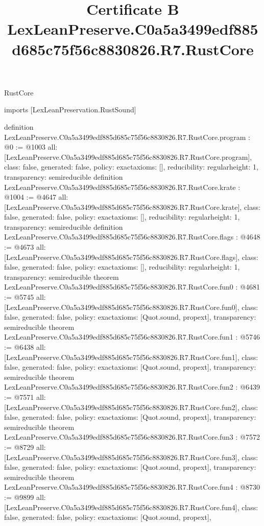 \begin{lexlean}{RustCore}
\title{Certificate B LexLeanPreserve.C0a5a3499edf885d685c75f56c8830826.R7.RustCore}
\begin{coremodule}
imports [LexLeanPreservation.RustSound]

definition LexLeanPreserve.C0a5a3499edf885d685c75f56c8830826.R7.RustCore.program : @0 := @1003 {
  all: [LexLeanPreserve.C0a5a3499edf885d685c75f56c8830826.R7.RustCore.program],
  class: false,
  generated: false,
  policy: exact{axioms: []},
  reducibility: regular{height: 1},
  transparency: semireducible
}
definition LexLeanPreserve.C0a5a3499edf885d685c75f56c8830826.R7.RustCore.krate : @1004 := @4647 {
  all: [LexLeanPreserve.C0a5a3499edf885d685c75f56c8830826.R7.RustCore.krate],
  class: false,
  generated: false,
  policy: exact{axioms: []},
  reducibility: regular{height: 1},
  transparency: semireducible
}
definition LexLeanPreserve.C0a5a3499edf885d685c75f56c8830826.R7.RustCore.flags : @4648 := @4673 {
  all: [LexLeanPreserve.C0a5a3499edf885d685c75f56c8830826.R7.RustCore.flags],
  class: false,
  generated: false,
  policy: exact{axioms: []},
  reducibility: regular{height: 1},
  transparency: semireducible
}
theorem LexLeanPreserve.C0a5a3499edf885d685c75f56c8830826.R7.RustCore.fun0 : @4681 := @5745 {
  all: [LexLeanPreserve.C0a5a3499edf885d685c75f56c8830826.R7.RustCore.fun0],
  class: false,
  generated: false,
  policy: exact{axioms: [Quot.sound, propext]},
  transparency: semireducible
}
theorem LexLeanPreserve.C0a5a3499edf885d685c75f56c8830826.R7.RustCore.fun1 : @5746 := @6438 {
  all: [LexLeanPreserve.C0a5a3499edf885d685c75f56c8830826.R7.RustCore.fun1],
  class: false,
  generated: false,
  policy: exact{axioms: [Quot.sound, propext]},
  transparency: semireducible
}
theorem LexLeanPreserve.C0a5a3499edf885d685c75f56c8830826.R7.RustCore.fun2 : @6439 := @7571 {
  all: [LexLeanPreserve.C0a5a3499edf885d685c75f56c8830826.R7.RustCore.fun2],
  class: false,
  generated: false,
  policy: exact{axioms: [Quot.sound, propext]},
  transparency: semireducible
}
theorem LexLeanPreserve.C0a5a3499edf885d685c75f56c8830826.R7.RustCore.fun3 : @7572 := @8729 {
  all: [LexLeanPreserve.C0a5a3499edf885d685c75f56c8830826.R7.RustCore.fun3],
  class: false,
  generated: false,
  policy: exact{axioms: [Quot.sound, propext]},
  transparency: semireducible
}
theorem LexLeanPreserve.C0a5a3499edf885d685c75f56c8830826.R7.RustCore.fun4 : @8730 := @9899 {
  all: [LexLeanPreserve.C0a5a3499edf885d685c75f56c8830826.R7.RustCore.fun4],
  class: false,
  generated: false,
  policy: exact{axioms: [Quot.sound, propext]},
}
\end{coremodule}
\end{lexlean}
